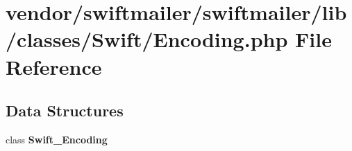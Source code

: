 \section{vendor/swiftmailer/swiftmailer/lib/classes/\+Swift/\+Encoding.php File Reference}
\label{_encoding_8php}
\subsection*{Data Structures}
\begin{DoxyCompactItemize}
\item 
class {\bf Swift\+\_\+\+Encoding}
\end{DoxyCompactItemize}
